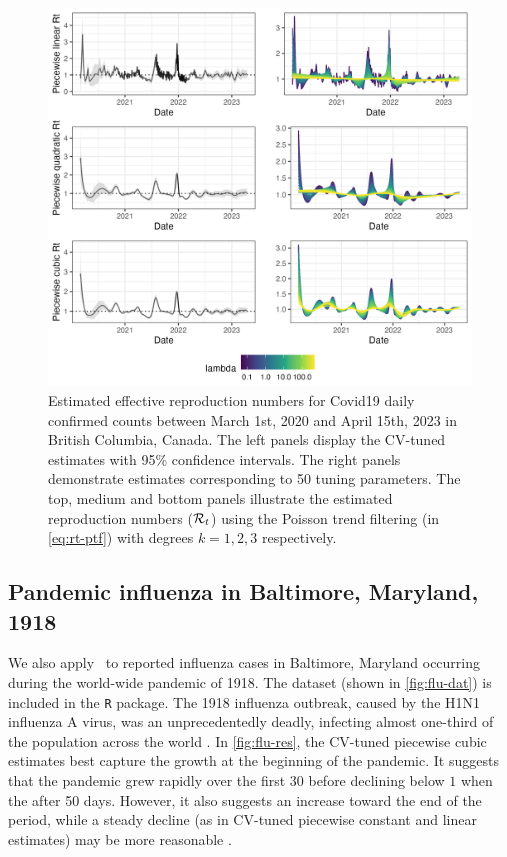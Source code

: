 \begin{figure}[tb]
    \centering
    \includegraphics[width=0.9\linewidth]{fig/covid_full_res.png}
    \caption{Estimated effective reproduction numbers for Covid19 daily confirmed counts between March 1st, 2020 and April 15th, 2023 in British Columbia, Canada. The left panels display the CV-tuned estimates with 95\% confidence intervals. The right panels demonstrate estimates corresponding to 50 tuning parameters. The top, medium and bottom panels illustrate the estimated reproduction numbers ($\mathcal{R}_t$) using the Poisson trend filtering (in \eqref{eq:rt-ptf}) with degrees $k=1,2,3$ respectively.} 
    \label{fig:covid-rt}
\end{figure} 


\subsection{Pandemic influenza in Baltimore, Maryland, 1918}

We also apply \RtEstim\ to reported influenza cases in Baltimore, Maryland
occurring during the world-wide pandemic of 1918. The dataset (shown in
\autoref{fig:flu-dat}) is included in the \EpiEstim \texttt{R} package. The 1918
influenza outbreak, caused by the H1N1 influenza A virus, was an unprecedentedly
deadly, infecting almost one-third of the population across the world
\citep{taubenberger20061918}. In \autoref{fig:flu-res}, the CV-tuned piecewise
cubic estimates best capture the growth at the beginning of the pandemic. It
suggests that the pandemic grew rapidly over  the first 30 before
declining below $1$ when the after 50 days. However, it also suggests an
increase toward the end of the period, while a steady decline (as in CV-tuned
piecewise constant and linear estimates) may be more reasonable . 


